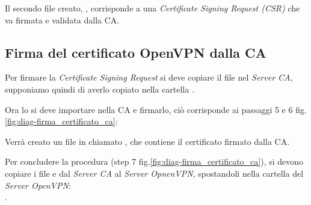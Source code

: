 Il secondo file creato, , corrisponde a una \textit{Certificate Signing Request (CSR)} che va firmata e validata dalla CA. 

\subsection{Firma del certificato OpenVPN dalla CA \ok} %
\label{subsec:sign_openvpn}

Per firmare la \textit{Certificate Signing Request} si deve copiare il file  nel \textit{Server CA}, supponiamo quindi di averlo copiato nella cartella .

Ora lo si deve importare nella CA e firmarlo, ciò corrisponde ai passaggi 5 e 6 fig.\ref{fig:diag-firma_certificato_ca}:


Verrà creato un file in  chiamato , che contiene il certificato firmato dalla CA.

Per concludere la procedura (step 7 fig.\ref{fig:diag-firma_certificato_ca}), si devono copiare i file  e  dal \textit{Server CA} al \textit{Server OpnenVPN}, spostandoli nella cartella del \textit{Server OpenVPN}: \\.

